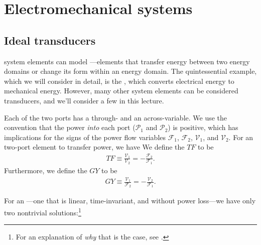 \documentclass[dynamic_systems.tex]{subfiles}
\begin{document}
\chapter{Electromechanical systems}
\label{ch:electromechanical_systems}

\section{Ideal transducers}
\tags{}

 system elements can model ---elements that transfer energy between two energy domains or change its form within an energy domain.
The quintessential example, which we will consider in detail, is the , which converts electrical energy to mechanical energy.
However, many other system elements can be considered transducers, and we'll consider a few in this lecture.
\tags{}

Each of the two ports has a through- and an across-variable.
We use the convention that the power \emph{into} each port ($\mathcal{P}_1$ and $\mathcal{P}_2$) is positive, which has implications for the signs of the power flow variables $\mathcal{F}_1$, $\mathcal{F}_2$, $\mathcal{V}_1$, and $\mathcal{V}_2$.
For an two-port element to transfer power, we have
\tags{}
We define the  $TF$ to be
\begin{align}
TF \equiv \frac{\mathcal{V}_1}{\mathcal{V}_2} = -\frac{\mathcal{F}_2}{\mathcal{F}_1}.
\end{align}
Furthermore, we define the  $GY$ to be
\begin{align}
GY \equiv \frac{\mathcal{V}_1}{\mathcal{F}_2} = -\frac{\mathcal{V}_2}{\mathcal{F}_1}.
\end{align}

For an ---one that is linear, time-invariant, and without power loss---we have only two nontrivial solutions:\footnote{For an explanation of \emph{why} that is the case, see \citet{Rowell1997}.}
\tags{}
\end{document}
